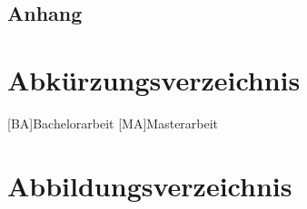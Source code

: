 \documentclass[12pt,a4paper,bibliography=totoc,listof=totoc]{scrartcl}
\begin{document}
\pagebreak



\setcounter{page}{1}

\begin{appendix}
\section*{Anhang}
{}




\end{appendix}


\section{Abkürzungsverzeichnis}
\begin{acronym}[KDE]
	[BA]{Bachelorarbeit}
	[MA]{Masterarbeit}

\end{acronym}
\pagebreak


\section {Abbildungsverzeichnis}
\listoffigures
\pagebreak
\end{document}
